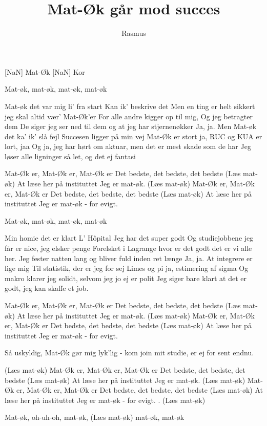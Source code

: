 \documentclass[a4paper,11pt]{article}
\title{Mat-Øk går mod succes}
\author{Rasmus}
\begin{document}
\maketitle

\begin{roles}
[NaN] Mat-Øk
[NaN] Kor
\end{roles}

\begin{song}
 Mat-øk, mat-øk, mat-øk, mat-øk

 Mat-øk det var mig li' fra start
Kan ik' beskrive det
Men en ting er helt sikkert
jeg skal altid vær' Mat-Øk'er
For alle andre kigger op til mig,
Og jeg betragter dem
De siger jeg ser ned til dem
og at jeg har stjernenøkker
Ja, ja.
Men Mat-øk det ka' ik' slå fejl
Succesen ligger på min vej
Mat-Øk er stort ja, RUC og KUA er lort, jaa
Og ja, jeg har hørt om aktuar, men det er mest skade som de har
Jeg løser alle ligninger så let, og det ej fantasi

 Mat-Øk er, Mat-Øk er, Mat-Øk er
Det bedste, det bedste, det bedste
(Læs mat-øk)
At læse her på instituttet
Jeg er mat-øk.
(Læs mat-øk)
Mat-Øk er, Mat-Øk er, Mat-Øk er
Det bedste, det bedste, det bedste
(Læs mat-øk)
At læse her på instituttet
Jeg er mat-øk - for evigt.

 Mat-øk, mat-øk, mat-øk, mat-øk

 Min homie det er klart L' Hôpital
Jeg har det super godt
Og studiejobbene jeg får er nice,
jeg elsker penge
Forelsket i Lagrange hvor er det godt
det er vi alle her.
Jeg fester natten lang og bliver fuld inden ret længe
Ja, ja.
At integrere er lige mig
Til statistik, der er jeg for sej
Limes og pi ja, estimering af sigma
Og makro klarer jeg solidt, selvom jeg jo ej er polit
Jeg siger bare klart at det er godt, jeg kan skaffe et job.

 Mat-Øk er, Mat-Øk er, Mat-Øk er
Det bedste, det bedste, det bedste
(Læs mat-øk)
At læse her på instituttet
Jeg er mat-øk.
(Læs mat-øk)
Mat-Øk er, Mat-Øk er, Mat-Øk er
Det bedste, det bedste, det bedste
(Læs mat-øk)
At læse her på instituttet
Jeg er mat-øk - for evigt.

 Så uskyldig, Mat-Øk gør mig lyk'lig - kom join mit studie, er ej for sent endnu.

 (Læs mat-øk)
Mat-Øk er, Mat-Øk er, Mat-Øk er
Det bedste, det bedste, det bedste
(Læs mat-øk)
At læse her på instituttet
Jeg er mat-øk.
(Læs mat-øk)
Mat-Øk er, Mat-Øk er, Mat-Øk er
Det bedste, det bedste, det bedste
(Læs mat-øk)
At læse her på instituttet
Jeg er mat-øk - for evigt. .
(Læs mat-øk)

 Mat-øk, oh-uh-oh, mat-øk,
(Læs mat-øk)
mat-øk, mat-øk
\end{song}
\end{document}
